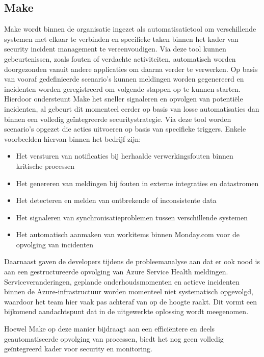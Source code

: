 \subsection{Make}
Make wordt binnen de organisatie ingezet als automatisatietool om verschillende systemen met elkaar te verbinden en specifieke taken binnen het kader van security incident management te vereenvoudigen. Via deze tool kunnen gebeurtenissen, zoals fouten of verdachte activiteiten, automatisch worden doorgezonden vanuit andere applicaties om daarna verder te verwerken. Op basis van vooraf gedefinieerde scenario’s kunnen meldingen worden gegenereerd en incidenten worden geregistreerd om volgende stappen op te kunnen starten. Hierdoor ondersteunt Make het sneller signaleren en opvolgen van potentiële incidenten, al gebeurt dit momenteel eerder op basis van losse automatisaties dan binnen een volledig geïntegreerde securitystrategie. Via deze tool worden scenario’s opgezet die acties uitvoeren op basis van specifieke triggers. Enkele voorbeelden hiervan binnen het bedrijf zijn: 

\begin{itemize}
    \item Het versturen van notificaties bij herhaalde verwerkingsfouten binnen kritische processen
    \item Het genereren van meldingen bij fouten in externe integraties en datastromen
    \item Het detecteren en melden van ontbrekende of inconsistente data
    \item Het signaleren van synchronisatieproblemen tussen verschillende systemen
    \item Het automatisch aanmaken van workitems binnen Monday.com voor de opvolging van incidenten
\end{itemize}

Daarnaast gaven de developers tijdens de probleemanalyse aan dat er ook nood is aan een gestructureerde opvolging van Azure Service Health meldingen. Serviceveranderingen, geplande onderhoudsmomenten en actieve incidenten binnen de Azure-infrastructuur worden momenteel niet systematisch opgevolgd, waardoor het team hier vaak pas achteraf van op de hoogte raakt. Dit vormt een bijkomend aandachtspunt dat in de uitgewerkte oplossing wordt meegenomen.

Hoewel Make op deze manier bijdraagt aan een efficiëntere en deels geautomatiseerde opvolging van processen, biedt het nog geen volledig geïntegreerd kader voor security en monitoring.

